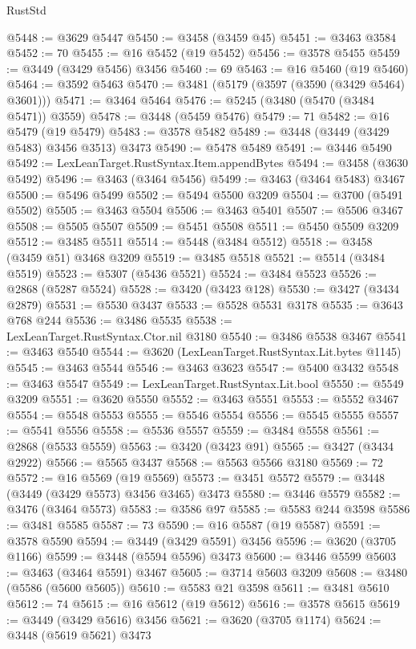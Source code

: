 \begin{lexlean}{RustStd}
\begin{coremodule}
{\begin{coremodule}
{{{{{{{{{{{{{{{{{{{{{{{{{{{{{{{{{{{{{{{{{{{{{{{{{{{{{{{{{{{{{{{{{{{{{{{{{{{{{{{{{{{{{@5448 := @3629 @5447
@5450 := @3458 (@3459 @45)
@5451 := @3463 @3584
@5452 := 70
@5455 := @16 @5452 (@19 @5452)
@5456 := @3578 @5455
@5459 := @3449 (@3429 @5456) @3456
@5460 := 69
@5463 := @16 @5460 (@19 @5460)
@5464 := @3592 @5463
@5470 := @3481 (@5179 (@3597 (@3590 (@3429 @5464) @3601)))
@5471 := @3464 @5464
@5476 := @5245 (@3480 (@5470 (@3484 @5471)) @3559)
@5478 := @3448 (@5459 @5476)
@5479 := 71
@5482 := @16 @5479 (@19 @5479)
@5483 := @3578 @5482
@5489 := @3448 (@3449 (@3429 @5483) @3456 @3513) @3473
@5490 := @5478 @5489
@5491 := @3446 @5490
@5492 := LexLeanTarget.RustSyntax.Item.appendBytes
@5494 := @3458 (@3630 @5492)
@5496 := @3463 (@3464 @5456)
@5499 := @3463 (@3464 @5483) @3467
@5500 := @5496 @5499
@5502 := @5494 @5500 @3209
@5504 := @3700 (@5491 @5502)
@5505 := @3463 @5504
@5506 := @3463 @5401
@5507 := @5506 @3467
@5508 := @5505 @5507
@5509 := @5451 @5508
@5511 := @5450 @5509 @3209
@5512 := @3485 @5511
@5514 := @5448 (@3484 @5512)
@5518 := @3458 (@3459 @51) @3468 @3209
@5519 := @3485 @5518
@5521 := @5514 (@3484 @5519)
@5523 := @5307 (@5436 @5521)
@5524 := @3484 @5523
@5526 := @2868 (@5287 @5524)
@5528 := @3420 (@3423 @128)
@5530 := @3427 (@3434 @2879)
@5531 := @5530 @3437
@5533 := @5528 @5531 @3178
@5535 := @3643 @768 @244
@5536 := @3486 @5535
@5538 := LexLeanTarget.RustSyntax.Ctor.nil @3180
@5540 := @3486 @5538 @3467
@5541 := @3463 @5540
@5544 := @3620 (LexLeanTarget.RustSyntax.Lit.bytes @1145)
@5545 := @3463 @5544
@5546 := @3463 @3623
@5547 := @5400 @3432
@5548 := @3463 @5547
@5549 := LexLeanTarget.RustSyntax.Lit.bool
@5550 := @5549 @3209
@5551 := @3620 @5550
@5552 := @3463 @5551
@5553 := @5552 @3467
@5554 := @5548 @5553
@5555 := @5546 @5554
@5556 := @5545 @5555
@5557 := @5541 @5556
@5558 := @5536 @5557
@5559 := @3484 @5558
@5561 := @2868 (@5533 @5559)
@5563 := @3420 (@3423 @91)
@5565 := @3427 (@3434 @2922)
@5566 := @5565 @3437
@5568 := @5563 @5566 @3180
@5569 := 72
@5572 := @16 @5569 (@19 @5569)
@5573 := @3451 @5572
@5579 := @3448 (@3449 (@3429 @5573) @3456 @3465) @3473
@5580 := @3446 @5579
@5582 := @3476 (@3464 @5573)
@5583 := @3586 @97
@5585 := @5583 @244 @3598
@5586 := @3481 @5585
@5587 := 73
@5590 := @16 @5587 (@19 @5587)
@5591 := @3578 @5590
@5594 := @3449 (@3429 @5591) @3456
@5596 := @3620 (@3705 @1166)
@5599 := @3448 (@5594 @5596) @3473
@5600 := @3446 @5599
@5603 := @3463 (@3464 @5591) @3467
@5605 := @3714 @5603 @3209
@5608 := @3480 (@5586 (@5600 @5605))
@5610 := @5583 @21 @3598
@5611 := @3481 @5610
@5612 := 74
@5615 := @16 @5612 (@19 @5612)
@5616 := @3578 @5615
@5619 := @3449 (@3429 @5616) @3456
@5621 := @3620 (@3705 @1174)
@5624 := @3448 (@5619 @5621) @3473
}}}}}}}}}}}}}}}}}}}}}}}}}}}}}}}}}}}}}}}}}}}}}}}}}}}}}}}}}}}}}}}}}}}}}}}}}}}}}}}}}}}}}
\end{coremodule}}
\end{coremodule}
\end{lexlean}

